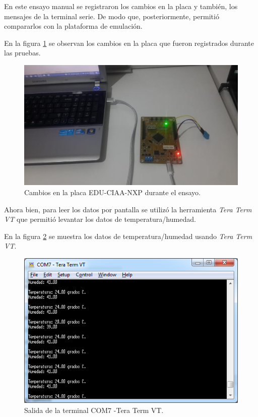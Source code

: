 En este ensayo manual se registraron los cambios en la placa y también, los mensajes de la terminal serie. De modo que, posteriormente, permitió compararlos con la plataforma de emulación.

En la figura \ref{fig:TestPlaca} se observan los cambios en la placa que fueron registrados durante las pruebas.


\begin{figure}[ht]
	\centering
	\includegraphics[scale=.50]{./Figures/TestPlaca.jpeg}
	\caption{Cambios en la placa EDU-CIAA-NXP durante el ensayo.}
	\label{fig:TestPlaca}
\end{figure}


Ahora bien, para leer los datos por pantalla se utilizó la herramienta \textit{Tera Term VT} que permitió levantar los datos de temperatura/humedad.

En la figura \ref{fig:TestTerminal} se muestra los datos de temperatura/humedad usando \textit{Tera Term VT}. 


\begin{figure}[ht]
	\centering
	\includegraphics[scale=.80]{./Figures/TestTerminal.png}
	\caption{Salida de la terminal COM7 -Tera Term VT.}
	\label{fig:TestTerminal}
\end{figure}



